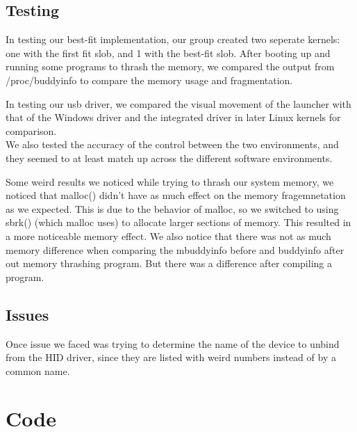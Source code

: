\documentclass[letterpaper,10pt,titlepage]{article}
\begin{document}
\subsection*{Testing} 

In testing our best-fit implementation, our group created two seperate kernels: one with the first fit slob, and 1 with the best-fit slob. After booting up and running some programs to thrash the memory, we compared the output from /proc/buddyinfo to compare the memory usage and fragmentation.

In testing our usb driver, we compared the visual movement of the launcher with that of the Windows driver and the integrated driver in later Linux kernels for comparison.\\

We also tested the accuracy of the control between the two environments, and they seemed to at least match up across the different software environments.

Some weird results we noticed while trying to thrash our system memory, we noticed that malloc() didn't have as much effect on the memory fragemnetation as we expected. This is due to the behavior of malloc, so we switched to using sbrk() (which malloc uses) to allocate larger sections of memory. This resulted in a more noticeable memory effect. We also notice that there was not as much memory difference when comparing the mbuddyinfo before and buddyinfo after out memory thrashing program. But there was a difference after compiling a program.

\subsection*{Issues}

Once issue we faced was trying to determine the name of the device to unbind from the HID driver, since they are listed with weird numbers instead of by a common name.

\section{Code}
\label{Implementation Specific Code}


\end{document}
